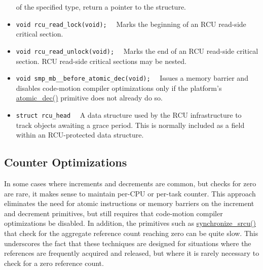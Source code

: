 \begin{itemize}
	of the specified type, return a pointer to the structure.
\item	{\tt void rcu\_read\_lock(void);}~~
	Marks the beginning of an RCU read-side critical section.
\item	{\tt void rcu\_read\_unlock(void);}~~
	Marks the end of an RCU read-side critical section.
	RCU read-side critical sections may be nested.
\item	{\tt void smp\_mb\_\_before\_atomic\_dec(void);}~~
	Issues a memory barrier and disables code-motion compiler
	optimizations only if the platform's \url{atomic_dec()}
	primitive does not already do so.
\item	{\tt struct rcu\_head}~~
	A data structure used by the RCU infrastructure to track
	objects awaiting a grace period.
	This is normally included as a field within an RCU-protected
	data structure.
\end{itemize}

\subsection{Counter Optimizations}
\label{sec:defer:Counter Optimizations}

In some cases where increments and decrements are common, but checks
for zero are rare, it makes sense to maintain per-CPU or per-task
counter.
This approach eliminates the need for atomic instructions or memory
barriers on the increment and decrement primitives, but still requires
that code-motion compiler optimizations be disabled.
In addition, the primitives such as \url{synchronize_srcu()}
that check for the aggregate reference
count reaching zero can be quite slow.
This underscores the fact that these techniques are designed
for situations where the references are frequently acquired and
released, but where it is rarely necessary to check for a zero
reference count.
